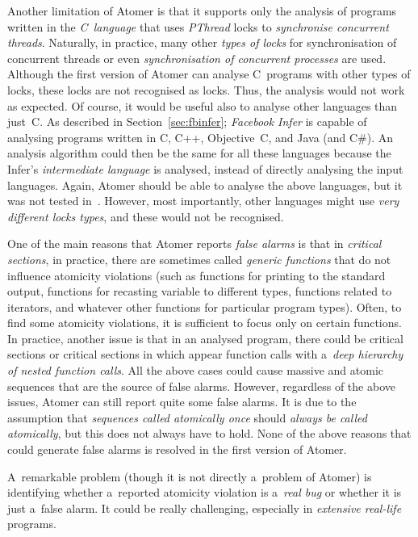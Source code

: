 Another limitation of Atomer is that it supports only the analysis of programs
written in the \emph{C~language} that uses \emph{PThread} locks to
\emph{synchronise concurrent threads}. Naturally, in practice, many other
\emph{types of locks} for synchronisation of concurrent threads or even
\emph{synchronisation of concurrent processes} are used. Although the first
version of Atomer can analyse C~programs with other types of locks, these locks
are not recognised as locks. Thus, the analysis would not work as expected. Of
course, it would be useful also to analyse other languages than just~C. As
described in Section~\ref{sec:fbinfer}; \emph{Facebook Infer} is capable of
analysing programs written in C, C++, Objective~C, and Java (and C\#). An
analysis algorithm could then be the same for all these languages because the
Infer's \emph{intermediate language} is analysed, instead of directly
analysing the input languages. Again, Atomer should be able to analyse the
above languages, but it was not tested in~\cite{harmimBP}. However, most
importantly, other languages might use \emph{very different locks types}, and
these would not be recognised.

One of the main reasons that Atomer reports \emph{false alarms} is that in
\emph{critical sections}, in practice, there are sometimes called
\emph{generic functions} that do not influence atomicity violations (such as
functions for printing to the standard output, functions for recasting variable
to different types, functions related to iterators, and whatever other 
functions for particular program types). Often, to find some atomicity
violations, it is sufficient to focus only on certain  functions.
In practice, another issue is that in an analysed program, there could be
 critical sections or critical sections in which appear function calls
with a~\emph{deep hierarchy of nested function calls}. All the above cases could
cause massive and  atomic sequences that are the source of false
alarms. However, regardless of the above issues, Atomer can still report quite
some false alarms. It is due to the assumption that \emph{sequences called
atomically once} should \emph{always be called atomically}, but this does not
always have to hold. None of the above reasons that could generate false alarms
is resolved in the first version of Atomer.

A~remarkable problem (though it is not directly a~problem of Atomer) is
identifying whether a~reported atomicity violation is a~\emph{real bug} or
whether it is just a~false alarm. It could be really challenging, especially
in \emph{extensive real-life} programs.

